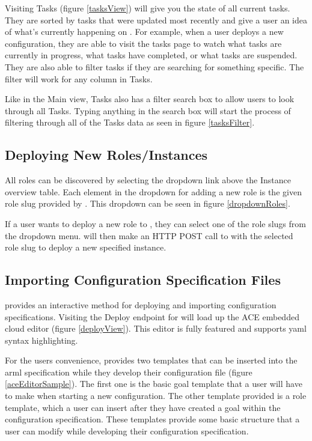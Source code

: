 Visiting Tasks (figure \ref{tasksView}) will give you the state of all current tasks. They are sorted by tasks that were updated most recently and give a user an idea of what's currently happening on \ancor{}. For example, when a user deploys a new configuration, they are able to visit the tasks page to watch what tasks are currently in progress, what tasks have completed, or what tasks are suspended. They are also able to filter tasks if they are searching for something specific. The filter will work for any column in Tasks.

Like in the Main view, Tasks also has a filter search box to allow users to look through all Tasks. Typing anything in the search box will start the process of filtering through all of the Tasks data as seen in figure \ref{tasksFilter}.

\subsection{Deploying New Roles/Instances}

All roles can be discovered by selecting the dropdown link above the Instance overview table. Each element in the dropdown for adding a new role is the given role slug provided by \ancor{}. This dropdown can be seen in figure \ref{dropdownRoles}.

If a user wants to deploy a new role to \ancor{}, they can select one of the role slugs from the dropdown menu. \projectName{} will then make an HTTP POST call to \ancor{} with the selected role slug to deploy a new specified instance.

\subsection{Importing Configuration Specification Files}

\projectName{} provides an interactive method for deploying and importing configuration specifications. Visiting the Deploy endpoint for \projectName{} will load up the ACE embedded cloud editor (figure \ref{deployView}). This editor is fully featured and supports yaml syntax highlighting.

For the users convenience, \projectName{} provides two templates that can be inserted into the arml specification while they develop their configuration file (figure \ref{aceEditorSample}). The first one is the basic goal template that a user will have to make when starting a new configuration. The other template provided is a role template, which a user can insert after they have created a goal within the configuration specification. These templates provide some basic structure that a user can modify while developing their configuration specification.

